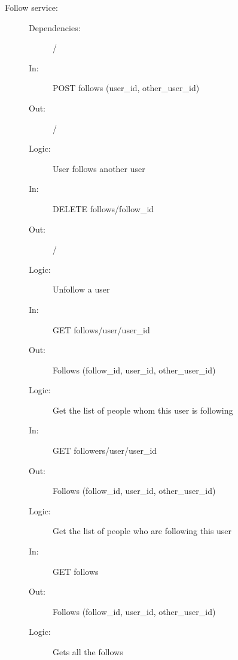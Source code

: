 \documentclass{article}
\begin{document}
\begin{description}
    \item [Follow service:]
    \begin{description}
        \item[]
        \item[Dependencies:] /
    \end{description}
    \begin{description}
        \item[]
        \item[In:] POST follows (user\_id, other\_user\_id)
        \item[Out:] /
        \item[Logic:] User follows another user
        \item[]
    \end{description}
    \begin{description}
        \item[In:] DELETE follows/follow\_id
        \item[Out:] /
        \item[Logic:] Unfollow a user
        \item[]
    \end{description}
    \begin{description}
        \item[In:] GET follows/user/user\_id
        \item[Out:] Follows (follow\_id, user\_id, other\_user\_id)
        \item[Logic:] Get the list of people whom this user is following
        \item[]
    \end{description}
        \begin{description}
        \item[In:] GET followers/user/user\_id
        \item[Out:] Follows (follow\_id, user\_id, other\_user\_id)
        \item[Logic:] Get the list of people who are following this user
        \item[]
    \end{description}
    \begin{description}
        \item[In:] GET follows
        \item[Out:] Follows (follow\_id, user\_id, other\_user\_id)
        \item[Logic:] Gets all the follows
    \end{description}
\end{description}
\end{document}
